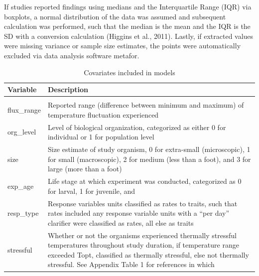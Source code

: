 \documentclass[12pt,twoside]{reedthesis}
\begin{document}
If studies reported findings using medians and the Interquartile Range (IQR) via boxplots, a normal distribution of the data was assumed and subsequent calculation was performed, such that the median is the mean and the IQR is the SD with a conversion calculation (Higgins et al., 2011). Lastly, if extracted values were missing variance or sample size estimates, the points were automatically excluded via data analysis software metafor.

\clearpage
\begin{table}[!h]

\caption{\label{tab:unnamed-chunk-9}Covariates included in models}
\centering
\begin{tabular}[t]{l>{\raggedright\arraybackslash}p{8cm}}
\toprule
\textbf{Variable} & \textbf{Description}\\
\midrule
\cellcolor{gray!6}{mean\_temp\_constant} & \cellcolor{gray!6}{Reported mean temperature in study}\\
flux\_range & Reported range (difference between minimum 
                                     and maximum) of temperature fluctuation experienced\\
org\_level & Level of biological organization, categorized
                                     as either 0 for individual or 1 for population level
\cellcolor{gray!6}{                                     responses}\\
size & Size estimate of study organism, 0 for extra-small
                                     (microscopic), 1 for small (macroscopic), 2 for medium 
                                     (less than a foot), and 3 for large (more than a foot)\\
exp\_age & Life stage at which experiment was conducted, 
                                     categorized as 0 for larval, 1 for juvenile, and 
\cellcolor{gray!6}{                                     2 for adult}\\
\addlinespace
resp\_type & Response variables units classified as rates to traits, 
                                     such that rates included any response variable units with a
                                     “per day” clarifier were classified as rates, all else as
                                     traits\\
stressful & Whether or not the organisms experienced thermally stressful 
                                     temperatures throughout study duration, if temperature range 
                                     exceeded Topt, classified as thermally stressful, else not
                                     thermally stressful. See Appendix Table 1 for references in which
\cellcolor{gray!6}{                                     organisms’ thermal stress metrics were included}\\
\bottomrule
\end{tabular}
\end{table}
\clearpage
\end{document}

